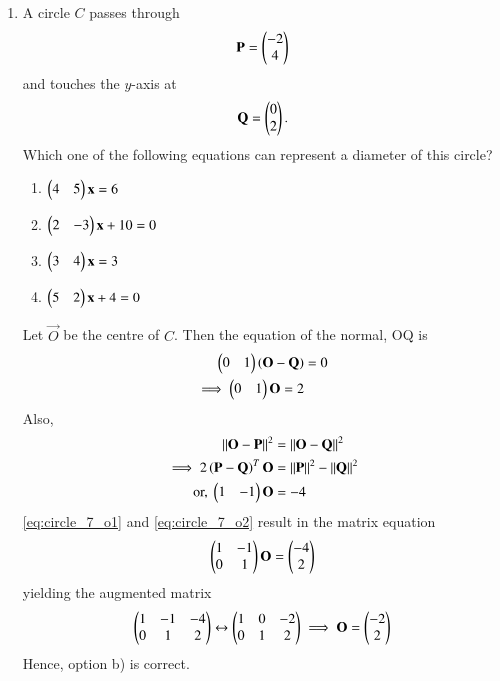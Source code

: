 \documentclass[journal,12pt,twocolumn]{IEEEtran}
\begin{document}
\begin{enumerate}[label=\arabic*]
\item A circle $C$ passes through 
\begin{equation} 
\mathbf{P}=\begin{pmatrix}-2\\ 4\end{pmatrix} 
\label{eq:circle_7_p}
\end{equation} 
and touches the $y$-axis at 
\begin{equation} 
\mathbf{Q}=\begin{pmatrix}0\\ 2\end{pmatrix}. 
\label{eq:circle_7_q}
\end{equation}
Which one of the  following equations can represent a diameter of this circle?
\begin{enumerate} 
\item $\begin{pmatrix}4 & 5\end{pmatrix}\mathbf{x} = 6 $
\item $\begin{pmatrix}2 & -3\end{pmatrix}\mathbf{x} +10 = 0 $
\item $\begin{pmatrix}3 & 4\end{pmatrix}\mathbf{x} = 3 $
\item $\begin{pmatrix}5 & 2\end{pmatrix}\mathbf{x} +4= 0 $
\end{enumerate} 
\solution Let $\vec{O}$ be the centre of $C$. Then the equation of the normal, OQ is
\begin{align}
\begin{pmatrix}0 & 1\end{pmatrix}\left(\mathbf{O}-\mathbf{Q}\right) &= 0
\nonumber \\ 
\implies \begin{pmatrix}0 & 1\end{pmatrix}\mathbf{O} = 2
\label{eq:circle_7_o1}
\end{align}
%
Also, 
\begin{align}
\left\Vert\mathbf{O}-\mathbf{P}\right\Vert^2&=\left\Vert\mathbf{O}-\mathbf{Q}\right\Vert^2 
\nonumber \\
\implies 2\left(\mathbf{P}-\mathbf{Q}\right)^T\mathbf{O} &= \left\Vert\mathbf{P}\right\Vert^2-\left\Vert\mathbf{Q}\right\Vert^2 
\nonumber \\
\text{or, } \begin{pmatrix}1 & -1\end{pmatrix}\mathbf{O} &= -4
\label{eq:circle_7_o2}
\end{align}
%
\eqref{eq:circle_7_o1} and \eqref{eq:circle_7_o2} result in the matrix equation
\begin{align}
\begin{pmatrix}1 & -1 \\ 0 & 1\end{pmatrix}\mathbf{O} = \begin{pmatrix}-4\\2\end{pmatrix}
\label{eq:circle_7_matrix}
\end{align}
yielding the augmented matrix
\begin{align}
\begin{pmatrix}1 & -1 & -4\\ 0 & 1 & 2\end{pmatrix} \leftrightarrow \begin{pmatrix}1 & 0 & -2\\ 0 & 1 & 2\end{pmatrix}\implies \mathbf{O} = \begin{pmatrix}-2 \\2\end{pmatrix}
\label{eq:circle_7_o}
\end{align}
Hence, option b)  is correct.

\end{enumerate}
\end{document}
